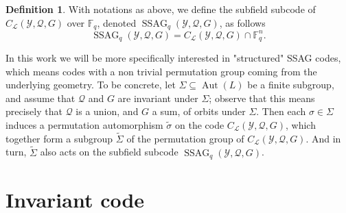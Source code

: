 \documentclass[10pt]{article}
\newtheorem{prop1}[thm]{Proposition}
\theoremstyle{definition}
\theoremstyle{definition}
\theoremstyle{definition}
\newtheorem{def1}[thm]{Definition}
\newcommand{\PP}{\mathbb{P}}
\newcommand{\Fqm}{\mathbb{F}_{q^m}}
\newcommand{\Fq}{\mathbb{F}_q}
\newcommand{\su}{\subseteq}
\newcommand{\Y}{\mathcal{Y}}
\newcommand{\QR}{\mathcal{Q}}
\newcommand{\Div}{\operatorname{Div}}
\newcommand{\Aut}{\operatorname{Aut}}
\newcommand{\ssag}{\operatorname{SSAG}}
\newcommand{\calL}{\mathcal{L}}
\begin{document}
\begin{def1}
With notations as above, we define the subfield subcode of $C_{\calL}(\Y,\QR,G)$ over $\Fq$, denoted $\ssag_q(\Y,\QR,G)$, as follows
\[ \ssag_q(\Y,\QR,G) = C_{\calL}(\Y,\QR,G) \cap \Fq^n.\]
\end{def1}

In this work we will be more specifically interested in "structured" SSAG codes, which means codes with a non trivial permutation group coming from the underlying geometry.
To be concrete, let $\Sigma \su \Aut(L)$ be a finite subgroup, 
and assume that $\QR$ and $G$ are invariant under $\Sigma$;
observe that this means precisely that $\QR$ is a union, and $G$ a sum, of orbits under $\Sigma$.
Then each $\sigma\in\Sigma$ induces a permutation automorphism $\tilde{\sigma}$ on the code $C_{\calL}(\Y,\QR,G)$, which together form a subgroup $\tilde{\Sigma}$ of the permutation group of $C_{\calL}(\Y,\QR,G)$. 
And in turn, $\tilde{\Sigma}$ also acts on the subfield subcode $\ssag_q(\Y,\QR,G)$.

%






\section{Invariant code}
\end{document}
